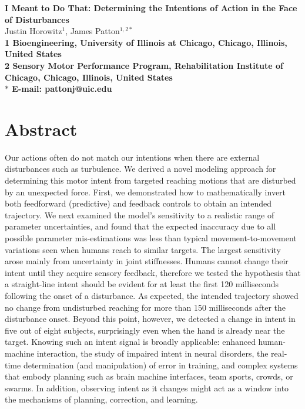 \pagestyle{myheadings}

\usepackage[section]{placeins}
\usepackage{graphics} %






\begin{flushleft}
{\Large
\textbf{I Meant to Do That: Determining the Intentions of Action in the Face of Disturbances}
}
\\
Justin Horowitz$^{1}$, 
James Patton$^{1,2\ast}$
\\
\bf{1} Bioengineering, University of Illinois at Chicago, Chicago, Illinois, United States
\\
\bf{2} Sensory Motor Performance Program, Rehabilitation Institute of Chicago, Chicago, Illinois, United States
\\
$\ast$ E-mail: pattonj@uic.edu
\end{flushleft}

\section*{Abstract}
Our actions often do not match our intentions when there are external disturbances such as turbulence. We derived a novel modeling approach for determining this motor intent from targeted reaching motions that are disturbed by an unexpected force. First, we demonstrated how to mathematically invert both feedforward (predictive) and feedback controls to obtain an intended trajectory. We next examined the model's sensitivity to a realistic range of parameter uncertainties, and found that the expected inaccuracy due to all possible parameter mis-estimations was less than typical movement-to-movement variations seen when humans reach to similar targets. The largest sensitivity arose mainly from uncertainty in joint stiffnesses. Humans cannot change their intent until they acquire sensory feedback, therefore we tested the hypothesis that a straight-line intent should be evident for at least the first 120 milliseconds following the onset of a disturbance. As expected, the intended trajectory showed no change from undisturbed reaching for more than 150 milliseconds after the disturbance onset. Beyond this point, however, we detected a change in intent in five out of eight subjects, surprisingly even when the hand is already near the target. Knowing such an intent signal is broadly applicable: enhanced human-machine interaction, the study of impaired intent in neural disorders, the real-time determination (and manipulation) of error in training, and complex systems that embody planning such as brain machine interfaces, team sports, crowds, or swarms. In addition, observing intent as it changes might act as a window into the mechanisms of planning, correction, and learning.

